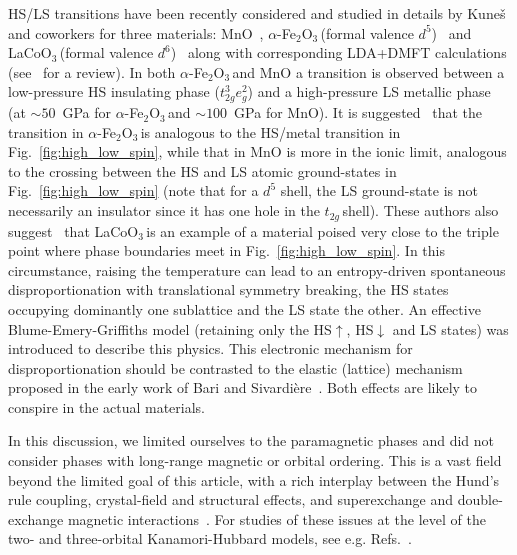 \documentclass[]{ar2e-changed}%
\def\spinup{\uparrow}
\def\spindown{\downarrow}
\def\ttg{$t_{2g}\,$}
\def\HEM{$\alpha$-Fe$_2$O$_3\,$}
\def\LCO{LaCoO$_3\,$}
\begin{document}
HS/LS transitions have been recently considered and studied in details by Kune\v{s} and coworkers 
for three materials: MnO~\cite{kunes_MnO_natmat_2008}, 
\HEM (formal valence $d^5$)~\cite{kunes_Fe2O3_prl_2009} and \LCO (formal valence $d^6$)~\cite{kunes_HS_LS_prl_2011}
along with corresponding LDA+DMFT calculations (see~\cite{kunes_review_epjst_2009} for a review). 
%
In both \HEM and MnO a transition is observed between a low-pressure HS insulating phase ($t_{2g}^3e_g^2$) 
and a high-pressure LS metallic phase (at $\sim 50$~GPa for \HEM and $\sim 100$~GPa for MnO). 
%
It is suggested~\cite{kunes_MnO_natmat_2008,kunes_Fe2O3_prl_2009,kunes_review_epjst_2009}  
that the transition in \HEM is analogous to the HS/metal transition in Fig.~\ref{fig:high_low_spin}, while 
that in MnO is more in the ionic limit, analogous to the crossing between the HS and LS atomic ground-states 
in Fig.~\ref{fig:high_low_spin} (note that 
for a $d^5$ shell, the LS ground-state is not necessarily an insulator since it has one hole in the \ttg shell).
%
These authors also suggest~\cite{kunes_HS_LS_prl_2011} that \LCO is an example of a material poised very close to the triple point where 
phase boundaries meet in Fig.~\ref{fig:high_low_spin}. 
%
In this circumstance, raising the temperature can lead to 
an entropy-driven spontaneous disproportionation with translational symmetry breaking, the HS states occupying dominantly 
one sublattice and the LS state the other.  An effective Blume-Emery-Griffiths model 
(retaining only the HS$\spinup$, HS$\spindown$ and LS states) was introduced to describe this physics. 
%
This electronic mechanism for disproportionation should be contrasted to the elastic (lattice) mechanism proposed in 
the early work of Bari and Sivardi\`ere~\cite{Bari_high-low_spin_Fe}. 
Both effects are likely to conspire in the actual materials. 

In this discussion, we limited ourselves to the paramagnetic phases and did not consider 
phases with long-range magnetic or orbital ordering.  
%
This is a vast field beyond the limited goal of this article, with a rich interplay between the Hund's rule coupling, crystal-field and structural effects, and 
superexchange and double-exchange magnetic interactions~\cite{TokuraNagaosa_OrbitalPhysics}. 
For studies of these issues at the level of the two- and three-orbital Kanamori-Hubbard models, see e.g.  Refs.~\cite{Quan_2orbitals_2el_Cfs_magnetic_order, Koyama_magOSMT, Peters_2orb_1el-orbital_magnetic_orders, Kita_CDMFT_1el_2orb_magn-orb, KoLee_SlaveRotors_2orbHub_SDW, ChanWernerMillis_3orbHub_orders}.
\end{document}
